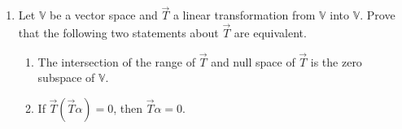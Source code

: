 \begin{enumerate}[label=\thesubsection.\arabic*.,ref=\thesubsection.\theenumi]
%
\\
\solution

\item Let $\mathbb{V}$ be a vector space and $\vec{T}$ a linear transformation from $\mathbb{V}$ into $\mathbb{V}$. Prove that the following two statements about $\vec{T}$ are equivalent.
\begin{enumerate}[label = (\alph*)]
\item The intersection of the range of $\vec{T}$ and null space of $\vec{T}$ is the zero subspace of $\mathbb{V}$.
\item If $\vec{T}(\vec{T}\alpha) = 0$, then $\vec{T}\alpha = 0$.
\end{enumerate}
%
\solution

\end{enumerate}
